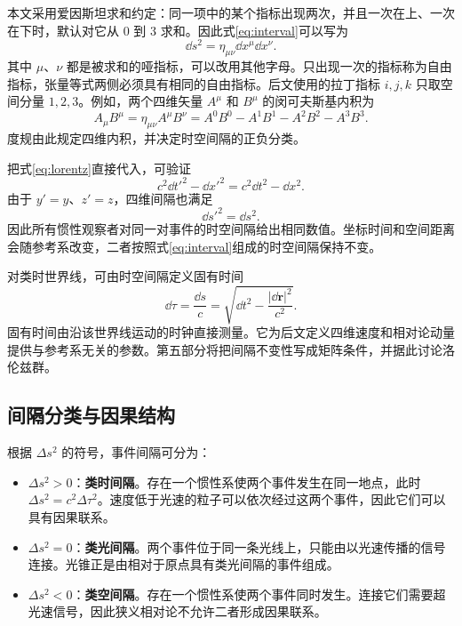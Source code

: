 \documentclass[style=classic,color=full]{lc-article}
\begin{document}
本文采用爱因斯坦求和约定：同一项中的某个指标出现两次，并且一次在上、一次在下时，默认对它从 $0$ 到 $3$ 求和。因此式\eqref{eq:interval}可以写为
\begin{equation}
  \dd s^2=\eta_{\mu\nu}\dd x^\mu\dd x^\nu.
\end{equation}
其中 $\mu$、$\nu$ 都是被求和的哑指标，可以改用其他字母。只出现一次的指标称为自由指标，张量等式两侧必须具有相同的自由指标。后文使用的拉丁指标 $i,j,k$ 只取空间分量 $1,2,3$。例如，两个四维矢量 $A^\mu$ 和 $B^\mu$ 的闵可夫斯基内积为
\begin{equation}
  A_\mu B^\mu
  =\eta_{\mu\nu}A^\mu B^\nu
  =A^0B^0-A^1B^1-A^2B^2-A^3B^3.
  \label{eq:minkowskiinnerproduct}
\end{equation}
度规由此规定四维内积，并决定时空间隔的正负分类。

把式\eqref{eq:lorentz}直接代入，可验证
\begin{equation}
  c^2\dd t'^2-\dd x'^2=c^2\dd t^2-\dd x^2.
\end{equation}
由于 $y'=y$、$z'=z$，四维间隔也满足
\begin{equation}
  \dd s'^2=\dd s^2.
\end{equation}
因此所有惯性观察者对同一对事件的时空间隔给出相同数值。坐标时间和空间距离会随参考系改变，二者按照式\eqref{eq:interval}组成的时空间隔保持不变。

对类时世界线，可由时空间隔定义固有时间
\begin{equation}
  \dd\tau=\frac{\dd s}{c}
  =\sqrt{\dd t^2-\frac{\lvert\dd\bm r\rvert^2}{c^2}}.
  \label{eq:propertimegeometry}
\end{equation}
固有时间由沿该世界线运动的时钟直接测量。它为后文定义四维速度和相对论动量提供与参考系无关的参数。第五部分将把间隔不变性写成矩阵条件，并据此讨论洛伦兹群。

\subsection{间隔分类与因果结构}

根据 $\Delta s^2$ 的符号，事件间隔可分为：
\begin{itemize}
  \item $\Delta s^2>0$：\textbf{类时间隔}。存在一个惯性系使两个事件发生在同一地点，此时 $\Delta s^2=c^2\Delta\tau^2$。速度低于光速的粒子可以依次经过这两个事件，因此它们可以具有因果联系。
  \item $\Delta s^2=0$：\textbf{类光间隔}。两个事件位于同一条光线上，只能由以光速传播的信号连接。光锥正是由相对于原点具有类光间隔的事件组成。
  \item $\Delta s^2<0$：\textbf{类空间隔}。存在一个惯性系使两个事件同时发生。连接它们需要超光速信号，因此狭义相对论不允许二者形成因果联系。
\end{itemize}
\end{document}
